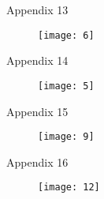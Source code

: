 \documentclass{beamer}
\begin{document}
\begin{frame}{Appendix 13}\hypertarget{13}{}
	
\begin{figure}
	\centering
	\texttt{[image: 6]}
	\caption{}
	\label{fig:6}
\end{figure}
\end{frame}
\begin{frame}{Appendix 14} \hypertarget{14}{}
	
\begin{figure}
	\centering
	\texttt{[image: 5]}
	\caption{}
	\label{fig:5}
\end{figure}
\end{frame}

\begin{frame}{Appendix 15} \hypertarget{15}{}
	
	\begin{figure}
		\centering
		\texttt{[image: 9]}
		\caption{}
		\label{fig:5}
	\end{figure}
\end{frame}

\begin{frame} {Appendix 16}\hypertarget{16}{}
	
	\begin{figure}
		\centering
		\texttt{[image: 12]}
		\caption{}
		\label{fig:5}
	\end{figure}
\end{frame}
\end{document}
